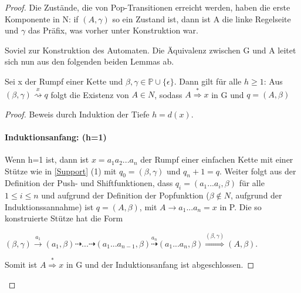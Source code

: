 \begin{proof}
Die Zustände, die von Pop-Transitionen erreicht werden, haben die erste Komponente in N: if $(A, \gamma)$ so ein Zustand ist, dann ist A die linke Regelseite und $\gamma$ das Präfix, was vorher unter Konstruktion war.

Soviel zur Konstruktion des Automaten. Die Äquivalenz zwischen G und A leitet sich nun aus den folgenden beiden Lemmas ab.
\begin{lemma}
Sei x der Rumpf einer Kette und $\beta, \gamma \in \mathbb{P \cup \{ \epsilon\} }$. Dann gilt für alle $h \geq 1$: Aus $(\beta, \gamma) \stackrel{x}{\rightsquigarrow} q$ folgt die Existenz von $A\in N$, sodass $A\stackrel{*}{\Rightarrow}x$ in G und $q=(A, \beta)$
\end{lemma}
\begin{proof}
Beweis durch Induktion der Tiefe $h=d(x)$.
\paragraph*{Induktionsanfang: (h=1)}
Wenn h=1 ist, dann ist $x=a_1a_2...a_n$ der Rumpf einer einfachen Kette mit einer Stütze wie in \autoref{Support} (1) mit $q_0 = (\beta, \gamma)$ und $q_n+1=q$. Weiter folgt aus der Definition der Push- und Shiftfunktionen, dass $q_i=(a_1...a_i, \beta)$ für alle $1 \leq i \leq n$ und aufgrund der Definition der Popfunktion ($\beta \notin N$, aufgrund der Induktionssannahme) ist $q=(A, \beta)$, mit $A \rightarrow a_1...a_n=x$ in P. Die so konstruierte Stütze hat die Form 
\begin{center}
$(\beta, \gamma) \stackrel{a_1}{\rightarrow} (a_1, \beta) \dashrightarrow ... \dashrightarrow (a_1...a_{n-1}, \beta) \stackrel{a_n}{\dashrightarrow} (a_1...a_n, \beta) \stackrel{(\beta, \gamma)} {\Rightarrow} (A,\beta)$.
\end{center}
Somit ist $A\stackrel{*}{\Rightarrow}x$ in G und der Induktionsanfang ist abgeschlossen.

\end{proof}
\end{proof}
